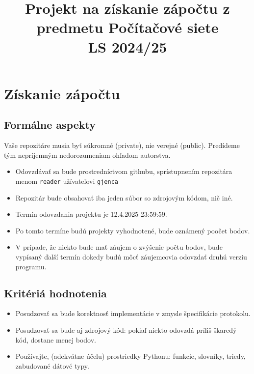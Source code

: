 \documentclass[11pt]{article}
\theoremstyle{definition}
\begin{document}
\title{Projekt na získanie zápočtu z predmetu Počítačové siete\\LS 2024/25}
\maketitle
\section{Získanie zápočtu}
\subsection{Formálne aspekty}

\begin{tcolorbox}[colback=red!5!white,colframe=red!75!black]
Vaše repozitáre musia byť súkromné (private), nie verejné (public). Predídeme
tým nepríjemným nedorozumeniam ohľadom autorstva.
\end{tcolorbox}

\begin{itemize}
\item Odovzdávať sa bude prostredníctvom githubu, sprístupnením repozitára
menom \texttt{reader} užívateľovi \texttt{gjenca}
\item Repozitár bude obsahovať iba jeden súbor so zdrojovým kódom, nič iné.
\item Termín odovzdania projektu je 12.4.2025 23:59:59.
\item Po tomto termíne budú projekty vyhodnotené, bude oznámený poočet
bodov.
\item V prípade, že niekto bude mať záujem o zvýšenie počtu bodov, bude
vypísaný ďalší termín dokedy budú môcť záujemcovia odovzdať druhú verziu
programu.
\end{itemize}

\subsection{Kritériá hodnotenia}
\begin{itemize}
\item Posudzovať sa bude korektnosť implementácie v zmysle špecifikácie protokolu.
\item Posudzovať sa bude aj zdrojový kód: pokiaľ niekto odovzdá príliš škaredý kód,
dostane menej bodov.
\item Používajte, (adekvátne účelu) prostriedky Pythonu: funkcie, slovníky, triedy, zabudované dátové typy.
\end{itemize}
\end{document}
